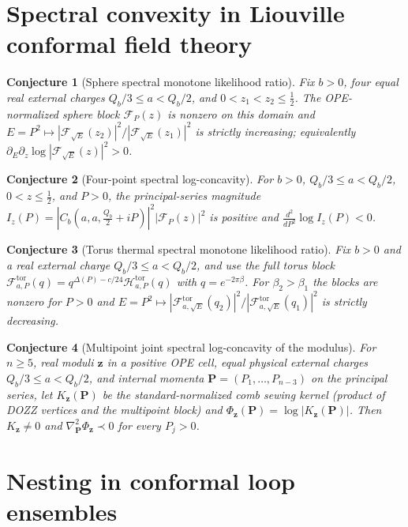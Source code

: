 \documentclass[11pt]{article}
\newtheorem{conjecture}{Conjecture}
\theoremstyle{definition}
\begin{document}
\section{Spectral convexity in Liouville conformal field theory}

\begin{conjecture}[Sphere spectral monotone likelihood ratio]\label{am9}
Fix \(b>0\), four equal real external charges \(Q_b/3\le a<Q_b/2\), and \(0<z_1<z_2\le\tfrac12\).  The OPE-normalized sphere block \(\mathcal F_P(z)\) is nonzero on this domain and \(E=P^2\mapsto|\mathcal F_{\sqrt E}(z_2)|^2/|\mathcal F_{\sqrt E}(z_1)|^2\) is strictly increasing; equivalently \(\partial_E\partial_z\log|\mathcal F_{\sqrt E}(z)|^2>0\).
\end{conjecture}

\begin{conjecture}[Four-point spectral log-concavity]\label{am10}
For \(b>0\), \(Q_b/3\le a<Q_b/2\), \(0<z\le\tfrac12\), and \(P>0\), the principal-series magnitude \(I_z(P)=|C_b(a,a,\tfrac{Q_b}2+iP)|^2|\mathcal F_P(z)|^2\) is positive and \(\tfrac{d^2}{dP^2}\log I_z(P)<0\).
\end{conjecture}

\begin{conjecture}[Torus thermal spectral monotone likelihood ratio]\label{am11}
Fix \(b>0\) and a real external charge \(Q_b/3\le a<Q_b/2\), and use the full torus block \(\mathcal F^{\mathrm{tor}}_{a,P}(q)=q^{\Delta(P)-c/24}\mathcal H^{\mathrm{tor}}_{a,P}(q)\) with \(q=e^{-2\pi\beta}\).  For \(\beta_2>\beta_1\) the blocks are nonzero for \(P>0\) and \(E=P^2\mapsto|\mathcal F^{\mathrm{tor}}_{a,\sqrt E}(q_2)|^2/|\mathcal F^{\mathrm{tor}}_{a,\sqrt E}(q_1)|^2\) is strictly decreasing.
\end{conjecture}

\begin{conjecture}[Multipoint joint spectral log-concavity of the modulus]\label{am12}
For \(n\ge5\), real moduli \(\mathbf z\) in a positive OPE cell, equal physical external charges \(Q_b/3\le a<Q_b/2\), and internal momenta \(\mathbf P=(P_1,\dots,P_{n-3})\) on the principal series, let \(K_{\mathbf z}(\mathbf P)\) be the standard-normalized comb sewing kernel (product of DOZZ vertices and the multipoint block) and \(\Phi_{\mathbf z}(\mathbf P)=\log|K_{\mathbf z}(\mathbf P)|\).  Then \(K_{\mathbf z}\ne0\) and \(\nabla^2_{\mathbf P}\Phi_{\mathbf z}\prec0\) for every \(P_j>0\).
\end{conjecture}

\section{Nesting in conformal loop ensembles}
\end{document}
